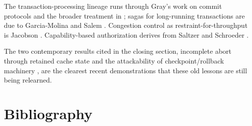The transaction-processing lineage runs through Gray's work on commit protocols
\cite{gray1978notes} and the broader treatment in \cite{gray1992transaction};
sagas for long-running transactions are due to Garcia-Molina and Salem
\cite{garciamolina1987sagas}. Congestion control as restraint-for-throughput is
Jacobson \cite{jacobson1988congestion}. Capability-based authorization derives
from Saltzer and Schroeder \cite{saltzer1975protection}.

The two contemporary results cited in the closing section, incomplete abort
through retained cache state \cite{abortedkv2026} and the attackability of
checkpoint/rollback machinery \cite{saferesume2026}, are the clearest recent
demonstrations that these old lessons are still being relearned.


\section*{Bibliography}

